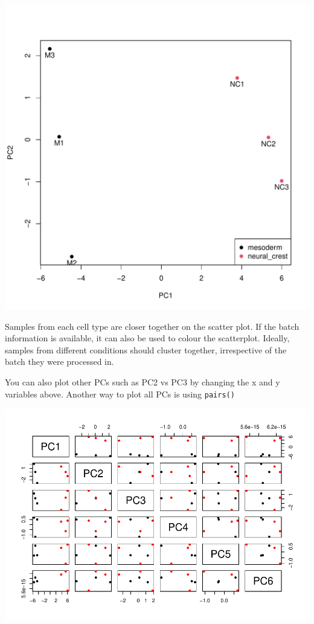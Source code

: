 \documentclass[
]{book}
\newenvironment{Shaded}{\begin{snugshade}}{\end{snugshade}}
\newcommand{\AttributeTok}[1]{\textcolor[rgb]{0.13,0.29,0.53}{#1}}
\newcommand{\DecValTok}[1]{\textcolor[rgb]{0.00,0.00,0.81}{#1}}
\newcommand{\FunctionTok}[1]{\textcolor[rgb]{0.13,0.29,0.53}{\textbf{#1}}}
\newcommand{\NormalTok}[1]{#1}
\newcommand{\SpecialCharTok}[1]{\textcolor[rgb]{0.81,0.36,0.00}{\textbf{#1}}}
\newcommand{\StringTok}[1]{\textcolor[rgb]{0.31,0.60,0.02}{#1}}
\begin{document}
\includegraphics{_main_files/figure-latex/unnamed-chunk-49-1.pdf}

Samples from each cell type are closer together on the scatter plot. If the batch information is available, it can also be used to colour the scatterplot. Ideally, samples from different conditions should cluster together, irrespective of the batch they were processed in.

You can also plot other PCs such as PC2 vs PC3 by changing the x and y variables above. Another way to plot all PCs is using \texttt{pairs()}

\begin{Shaded}
\end{Shaded}

\includegraphics{_main_files/figure-latex/unnamed-chunk-50-1.pdf}
\end{document}
